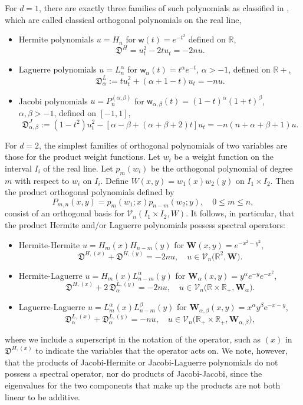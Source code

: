\documentclass{amsart}
\theoremstyle{remark}
\def\e{\mathrm{e}}
\def\sw{{\mathsf w}}
\def\fD{{\mathfrak D}}
\def\a{{\alpha}}
\def\b{{\beta}}
\def\Wb{{\bm W}}
\def\CV{{\mathcal V}}
\def\RR{{\mathbb R}}
\begin{document}
For $d =1$, there are exactly three families of such polynomials as classified in \cite{B}, which are 
called classical orthogonal polynomials on the real line,
\begin{itemize}
\item Hermite polynomials $u = H_n$ for $\sw(t) = e^{- t^2}$ defined on $\RR$, 
$$
      \fD^H =  u_t^2 - 2 t u_t = - 2 n u. %
$$
\item Laguerre polynomials $u= L_n^\a$ for $\sw_\a (t) = t^\a e^{- t}$, $\a > -1$, defined on $\RR+$, 
$$
       \fD^L_\a := t u_t^2 + (\a + 1 - t) u_t = - n u.  
$$
\item Jacobi polynomials $u= P_n^{(\a,\b)}$ for $\sw_{\a,\b} (t) = (1-t)^\a(1+t)^\b$, $\a, \b  > -1$, defined on $[-1,1]$, 
$$
      \fD^J_{\a,\b} := (1-t^2) u_t^2 - [\a - \b+(\a+\b+2) t] u_t = - n(n+\a + \b+1)u.
$$
\end{itemize}

For $d =2$, the simplest families of orthogonal polynomials of two variables are those for the product 
weight functions. Let $w_i$ be a weight function on the interval $I_i$ of the real line. Let $p_m(w_i)$ be 
the orthogonal polynomial of degree $m$ with respect to $w_i$ on $I_i$. Define 
$W(x,y) = w_1(x) w_2(y)$ on $I_1 \times I_2$. Then the product orthogonal polynomials defined by 
$$
    P_{m,n}(x,y) = p_m(w_1; x) p_{n-m}(w_2; y), \quad 0 \le m \le n,
$$ 
consist of an orthogonal basis for $\CV_n(I_1 \times I_2, W)$. It follows, in particular, that the product
Hermite and/or Laguerre polynomials possess spectral operators: 

\begin{itemize}
\item Hermite-Hermite $u = H_m(x) H_{n-m}(y)$ for $\Wb(x,y) = e^{- x^2-y^2}$, 
$$
      \fD^{H, (x)} + \fD^{H, (y)}  = - 2 n u, \quad u \in \CV_n\big(\RR^2, \Wb\big).
$$
\item Hermite-Laguerre $u= H_m(x) L_{n-m}^\a(y)$ for $\Wb_\a (x,y) = y^\a e^{- y} e^{-x^2}$, 
$$
       \fD^{H, (x)} +2\,  \fD_\a^{L, (y)} = - 2 n u, \quad u \in \CV_n\big(\RR \times \RR_+, \Wb_\a \big).
$$
\item Laguerre-Laguerre $u= L_m^\a(x) L_{n-m}^\b(y)$ for $\Wb_{\a,\b} (x,y) = x^\a y^\b \e^{-x-y}$, 
$$
        \fD_\a^{L, (x)} +  \fD_\a^{L, (y)}= - n u, \quad u \in \CV_n\big(\RR_+ \times \RR_+, \Wb_{\a,\b} \big),
$$
\end{itemize}
where we include a superscript in the notation of the operator, such as $(x)$ in $\fD^{H, (x)}$ to indicate
the variables that the operator acts on. We note, however, that the products of Jacobi-Hermite or 
Jacobi-Laguerre polynomials do not possess a spectral operator, nor do products of Jacobi-Jacobi, 
since the eigenvalues for the two components that make up the products are not both linear to be
additive. 
\end{document}
